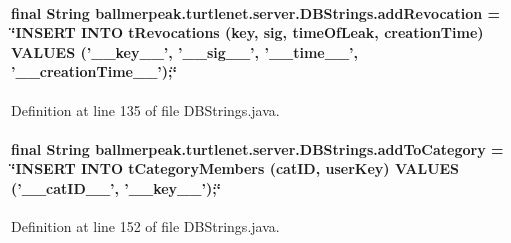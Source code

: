 \hypertarget{classballmerpeak_1_1turtlenet_1_1server_1_1DBStrings_a75d68f5b33bdd9fa483ebe6c4145b17e}{
\paragraph[{add\-Revocation}]{\setlength{\rightskip}{0pt plus 5cm}final String ballmerpeak.\-turtlenet.\-server.\-D\-B\-Strings.\-add\-Revocation = \char`\"{}I\-N\-S\-E\-R\-T I\-N\-T\-O t\-Revocations (key, sig, time\-Of\-Leak, creation\-Time) V\-A\-L\-U\-E\-S ('\-\_\-\-\_\-key\-\_\-\-\_\-', '\-\_\-\-\_\-sig\-\_\-\-\_\-', '\-\_\-\-\_\-time\-\_\-\-\_\-', '\-\_\-\-\_\-creation\-Time\-\_\-\-\_\-');\char`\"{}\hspace{0.3cm}{\ttfamily [static]}}}\label{classballmerpeak_1_1turtlenet_1_1server_1_1DBStrings_a75d68f5b33bdd9fa483ebe6c4145b17e}


Definition at line 135 of file D\-B\-Strings.\-java.

\hypertarget{classballmerpeak_1_1turtlenet_1_1server_1_1DBStrings_ae9cfc6daa2238b984d82b11442b47a49}{
\paragraph[{add\-To\-Category}]{\setlength{\rightskip}{0pt plus 5cm}final String ballmerpeak.\-turtlenet.\-server.\-D\-B\-Strings.\-add\-To\-Category = \char`\"{}I\-N\-S\-E\-R\-T I\-N\-T\-O t\-Category\-Members (cat\-I\-D, user\-Key) V\-A\-L\-U\-E\-S ('\-\_\-\-\_\-cat\-I\-D\-\_\-\-\_\-', '\-\_\-\-\_\-key\-\_\-\-\_\-');\char`\"{}\hspace{0.3cm}{\ttfamily [static]}}}\label{classballmerpeak_1_1turtlenet_1_1server_1_1DBStrings_ae9cfc6daa2238b984d82b11442b47a49}


Definition at line 152 of file D\-B\-Strings.\-java.

